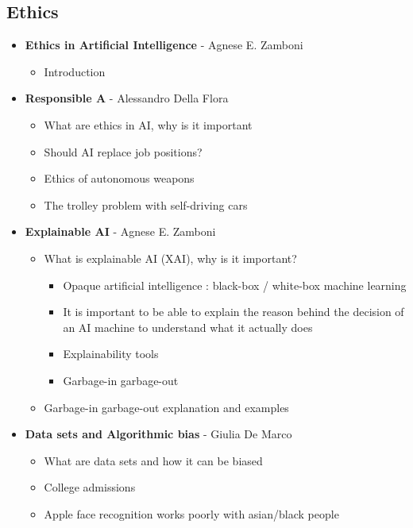 \documentclass[12pt]{article}
\begin{document}
\subsection{Ethics}
\begin{itemize}[label=$\bullet$]
    \item \textbf{Ethics in Artificial Intelligence} - Agnese E. Zamboni
     \begin{itemize}[label=$\circ$]
         \item Introduction 
     \end{itemize}
    \item \textbf{Responsible A} - Alessandro Della Flora
     \begin{itemize}[label=$\circ$]
         \item What are ethics in AI, why is it important 
         \item Should AI replace job positions?
         \item Ethics of autonomous weapons
         \item The trolley problem with self-driving cars
     \end{itemize}
    \item \textbf{Explainable AI} - Agnese E. Zamboni
     \begin{itemize}[label=$\circ$]
         \item What is explainable AI (XAI), why is it important?
     \begin{itemize}
         \item Opaque artificial intelligence : black-box / white-box machine learning
         \item It is important to be able to explain the reason behind the decision of an AI machine to understand what it actually does
         \item Explainability tools
         \item Garbage-in garbage-out
     \end{itemize}
     \item Garbage-in garbage-out explanation and examples
     \end{itemize}
    \item \textbf{Data sets and Algorithmic bias} - Giulia De Marco
     \begin{itemize}[label=$\circ$]
         \item What are data sets and how it can be biased
         \item College admissions
         \item Apple face recognition works poorly with asian/black people

\end{itemize}
\end{itemize}
\end{document}
